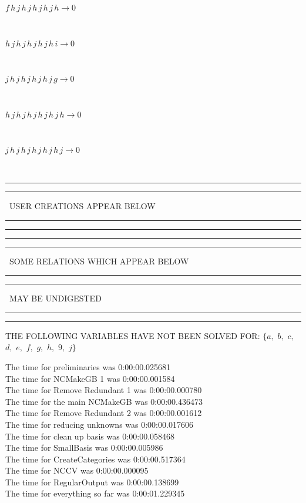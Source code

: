 \documentclass[rep10,leqno]{report}
\begin{document}
\begin{minipage}{6in}
$
f\,
 h\,
 j\,
 h\,
 j\,
 h\,
 j\,
 h\,
 j\,
 h\rightarrow 0
$
\end{minipage}\medskip \\
\begin{minipage}{6in}
$
h\,
 j\,
 h\,
 j\,
 h\,
 j\,
 h\,
 j\,
 h\,
 i\rightarrow 0
$
\end{minipage}\medskip \\
\begin{minipage}{6in}
$
j\,
 h\,
 j\,
 h\,
 j\,
 h\,
 j\,
 h\,
 j\,
 g\rightarrow 0
$
\end{minipage}\medskip \\
\begin{minipage}{6in}
$
h\,
 j\,
 h\,
 j\,
 h\,
 j\,
 h\,
 j\,
 h\,
 j\,
 h\rightarrow 0
$
\end{minipage}\medskip \\
\begin{minipage}{6in}
$
j\,
 h\,
 j\,
 h\,
 j\,
 h\,
 j\,
 h\,
 j\,
 h\,
 j\rightarrow 0
$
\end{minipage}\\
\rule[2pt]{6in}{1pt}\hfil\break
\rule[2.5pt]{1.701in}{1pt}
\ USER CREATIONS APPEAR BELOW\ 
\rule[2.5pt]{1.701in}{1pt}\hfil\break
\rule[2pt]{6in}{1pt}\hfil\break
\rule[2pt]{6in}{4pt}\hfil\break
\rule[2pt]{1.45in}{4pt}
\ SOME RELATIONS WHICH APPEAR BELOW\ 
\rule[2pt]{1.45in}{4pt}\hfil\break
\rule[2pt]{2.18in}{4pt}
\ MAY BE UNDIGESTED\ 
\rule[2pt]{2.18in}{4pt}\hfil\break
\rule[2pt]{6in}{4pt}\hfil\break
THE FOLLOWING VARIABLES HAVE NOT BEEN SOLVED FOR:\hfil\break
$\{a,
$ $
b,
$ $
c,
$ $
d,
$ $
e,
$ $
f,
$ $
g,
$ $
h,
$ $
9,
$ $
j\}$
\smallskip\\
\vspace{10pt}

\noindent
The time for preliminaries was 0:00:00.025681\\
The time for NCMakeGB 1 was 0:00:00.001584\\
The time for Remove Redundant 1 was 0:00:00.000780\\
The time for the main NCMakeGB was 0:00:00.436473\\
The time for Remove Redundant 2 was 0:00:00.001612\\
The time for reducing unknowns was 0:00:00.017606\\
The time for clean up basis was 0:00:00.058468\\
The time for SmallBasis was 0:00:00.005986\\
The time for CreateCategories was 0:00:00.517364\\
The time for NCCV was 0:00:00.000095\\
The time for RegularOutput was 0:00:00.138699\\
The time for everything so far was 0:00:01.229345\\
\end{document}
